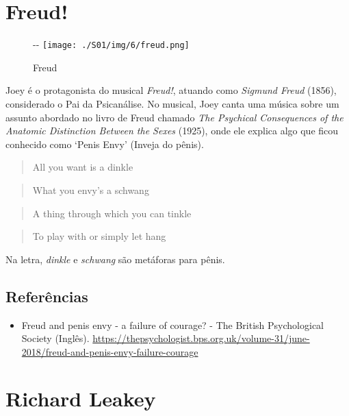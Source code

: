 \hypertarget{freud}{%
\section{Freud!}\label{freud}}

\begin{figure}[!ht]
  \begin{adjustwidth}{-\oddsidemargin-1in}{-\rightmargin}
    \centering
    \texttt{[image: ./S01/img/6/freud.png]}
    \caption{Freud\label{fig:freud}}
  \end{adjustwidth}
\end{figure}

Joey é o protagonista do musical \emph{Freud!}, atuando como
\emph{Sigmund Freud} (1856), considerado o Pai da Psicanálise. No
musical, Joey canta uma música sobre um assunto abordado no livro de
Freud chamado \emph{The Psychical Consequences of the Anatomic
Distinction Between the Sexes} (1925), onde ele explica algo que ficou
conhecido como `Penis Envy' (Inveja do pênis).

\begin{quote}
All you want is a dinkle
\end{quote}

\begin{quote}
What you envy's a schwang
\end{quote}

\begin{quote}
A thing through which you can tinkle
\end{quote}

\begin{quote}
To play with or simply let hang
\end{quote}

Na letra, \emph{dinkle} e \emph{schwang} são metáforas para pênis.

\hypertarget{referuxeancias}{%
\subsection{Referências}\label{referuxeancias}}

\begin{itemize}
\tightlist
\item
  \sloppy Freud and penis envy - a failure of courage? - The British Psychological Society (Inglês). \url{https://thepsychologist.bps.org.uk/volume-31/june-2018/freud-and-penis-envy-failure-courage}
\end{itemize}

\hypertarget{richard-leakey}{%
\section{Richard Leakey}\label{richard-leakey}}

